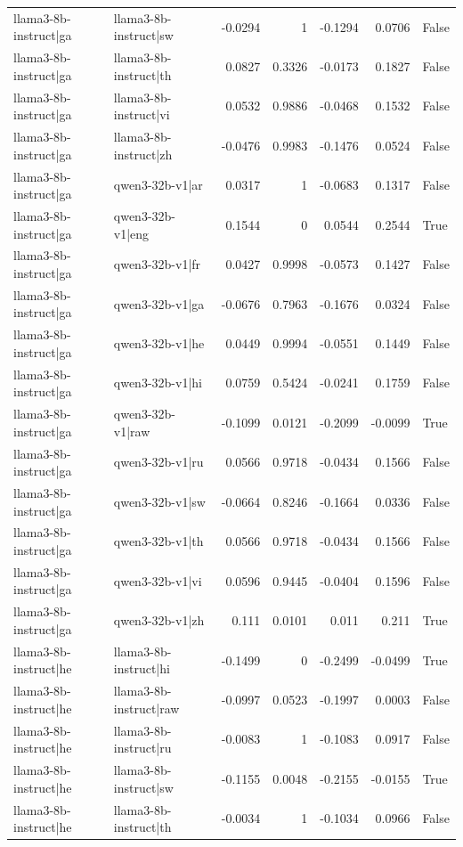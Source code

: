 \begin{table}
\begin{tabular}{l l r r r r l}
llama3-8b-instruct|ga & llama3-8b-instruct|sw & -0.0294 & 1 & -0.1294 & 0.0706 & False \\
llama3-8b-instruct|ga & llama3-8b-instruct|th & 0.0827 & 0.3326 & -0.0173 & 0.1827 & False \\
llama3-8b-instruct|ga & llama3-8b-instruct|vi & 0.0532 & 0.9886 & -0.0468 & 0.1532 & False \\
llama3-8b-instruct|ga & llama3-8b-instruct|zh & -0.0476 & 0.9983 & -0.1476 & 0.0524 & False \\
llama3-8b-instruct|ga & qwen3-32b-v1|ar & 0.0317 & 1 & -0.0683 & 0.1317 & False \\
llama3-8b-instruct|ga & qwen3-32b-v1|eng & 0.1544 & 0 & 0.0544 & 0.2544 & True \\
llama3-8b-instruct|ga & qwen3-32b-v1|fr & 0.0427 & 0.9998 & -0.0573 & 0.1427 & False \\
llama3-8b-instruct|ga & qwen3-32b-v1|ga & -0.0676 & 0.7963 & -0.1676 & 0.0324 & False \\
llama3-8b-instruct|ga & qwen3-32b-v1|he & 0.0449 & 0.9994 & -0.0551 & 0.1449 & False \\
llama3-8b-instruct|ga & qwen3-32b-v1|hi & 0.0759 & 0.5424 & -0.0241 & 0.1759 & False \\
llama3-8b-instruct|ga & qwen3-32b-v1|raw & -0.1099 & 0.0121 & -0.2099 & -0.0099 & True \\
llama3-8b-instruct|ga & qwen3-32b-v1|ru & 0.0566 & 0.9718 & -0.0434 & 0.1566 & False \\
llama3-8b-instruct|ga & qwen3-32b-v1|sw & -0.0664 & 0.8246 & -0.1664 & 0.0336 & False \\
llama3-8b-instruct|ga & qwen3-32b-v1|th & 0.0566 & 0.9718 & -0.0434 & 0.1566 & False \\
llama3-8b-instruct|ga & qwen3-32b-v1|vi & 0.0596 & 0.9445 & -0.0404 & 0.1596 & False \\
llama3-8b-instruct|ga & qwen3-32b-v1|zh & 0.111 & 0.0101 & 0.011 & 0.211 & True \\
llama3-8b-instruct|he & llama3-8b-instruct|hi & -0.1499 & 0 & -0.2499 & -0.0499 & True \\
llama3-8b-instruct|he & llama3-8b-instruct|raw & -0.0997 & 0.0523 & -0.1997 & 0.0003 & False \\
llama3-8b-instruct|he & llama3-8b-instruct|ru & -0.0083 & 1 & -0.1083 & 0.0917 & False \\
llama3-8b-instruct|he & llama3-8b-instruct|sw & -0.1155 & 0.0048 & -0.2155 & -0.0155 & True \\
llama3-8b-instruct|he & llama3-8b-instruct|th & -0.0034 & 1 & -0.1034 & 0.0966 & False \\

\end{tabular}
\end{table}
